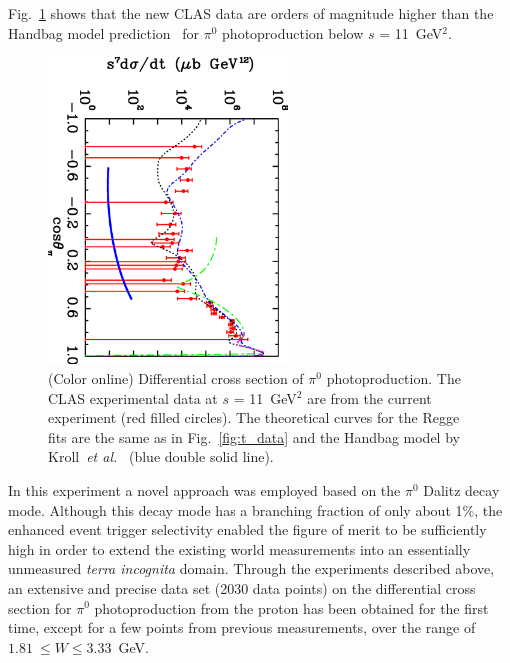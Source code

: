\documentclass[aps,prc,twocolumn,floatfix,showpacs,preprintnumbers,amsmath,amssymb,superscriptaddress,linenumbers]{revtex4-1}
\begin{document}
Fig.~\ref{fig:kroll} shows that the new CLAS data are orders of 
magnitude higher than the Handbag model prediction~\cite{Huang:2000kd} for $\pi^0$ 
photoproduction below $s$ = 11~GeV$^2$.
\begin{figure}[htb!]
	\centerline{
		\includegraphics[width=2.5in, angle=90]{kroll.eps}}
	
	\caption {(Color online) Differential cross section 
		of $\pi^0$ photoproduction. The CLAS experimental data 
		at $s$ = 11~GeV$^2$ are from the current experiment (red 
		filled circles). The theoretical curves for the Regge 
		fits are the same as in Fig.~\protect\ref{fig:t_data} 
		and the Handbag model by Kroll~\textit{et 
			al.}~\protect\cite{Huang:2000kd} (blue double solid 
		line).} \label{fig:kroll}
\end{figure}


In this experiment a novel approach was employed based on the $\pi^{0}$ Dalitz decay 
mode. Although this decay mode has a branching fraction of only about 1\%, 
the enhanced event trigger selectivity enabled the figure of merit to be 
sufficiently high in order to extend the existing world measurements into 
an essentially unmeasured {\it terra incognita} domain.
%
Through the experiments described above, an extensive and precise 
data set (2030 data points) on the differential cross section for 
$\pi^0$ photoproduction from the proton has been obtained 
for the first time, except for a few points from previous measurements, 
over the range of $1.81~\leq W\leq 3.33$~GeV. 
\end{document}
